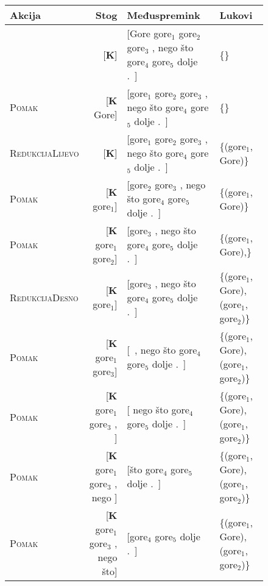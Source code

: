 \begin{figure}
  \tiny
  \begin{tabular}{l|rlm{4cm}}
  \hline
  \textbf{Akcija}           & \textbf{Stog}                                       & \textbf{Međuspremink}                                                       & \textbf{Lukovi} \\ \hline
                            & {[}\textbf{K}{]}                                    & {[}Gore gore$_1$ gore$_2$ gore$_3$ , nego što gore$_4$ gore$_5$ dolje .~{]} & \{\}           \\
  \textsc{Pomak}            & {[}\textbf{K} Gore{]}                               & {[}gore$_1$ gore$_2$ gore$_3$ , nego što gore$_4$ gore$_5$ dolje .~{]}      & \{\}             \\
  \textsc{RedukcijaLijevo}  & {[}\textbf{K}{]}                                    & {[}gore$_1$ gore$_2$ gore$_3$ , nego što gore$_4$ gore$_5$ dolje .~{]}      & \{(gore$_1$, Gore)\}  \\
  \textsc{Pomak}            & {[}\textbf{K} gore$_1${]}                           & {[}gore$_2$ gore$_3$ , nego što gore$_4$ gore$_5$ dolje .~{]}               & \{(gore$_1$, Gore)\}  \\
  \textsc{Pomak}            & {[}\textbf{K} gore$_1$ gore$_2${]}                  & {[}gore$_3$ , nego što gore$_4$ gore$_5$ dolje .~{]}                        & \{(gore$_1$, Gore),\}  \\
  \textsc{RedukcijaDesno}   & {[}\textbf{K} gore$_1${]}                           & {[}gore$_3$ , nego što gore$_4$ gore$_5$ dolje .~{]}                        & \{(gore$_1$, Gore), (gore$_1$, gore$_2$)\}  \\
  \textsc{Pomak}            & {[}\textbf{K} gore$_1$ gore$_3${]}                  & {[}~, nego što gore$_4$ gore$_5$ dolje .~{]}                                & \{(gore$_1$, Gore), (gore$_1$, gore$_2$)\}  \\
  \textsc{Pomak}            & {[}\textbf{K} gore$_1$ gore$_3$ , {]}               & {[} nego što gore$_4$ gore$_5$ dolje .~{]}                                  & \{(gore$_1$, Gore), (gore$_1$, gore$_2$)\}  \\
  \textsc{Pomak}            & {[}\textbf{K} gore$_1$ gore$_3$ , nego {]}          & {[}što gore$_4$ gore$_5$ dolje .~{]}                                        & \{(gore$_1$, Gore), (gore$_1$, gore$_2$)\}  \\
  \textsc{Pomak}            & {[}\textbf{K} gore$_1$ gore$_3$ , nego što{]}       & {[}gore$_4$ gore$_5$ dolje .~{]}                                            & \{(gore$_1$, Gore), (gore$_1$, gore$_2$)\}  \\

\end{tabular}
\end{figure}
